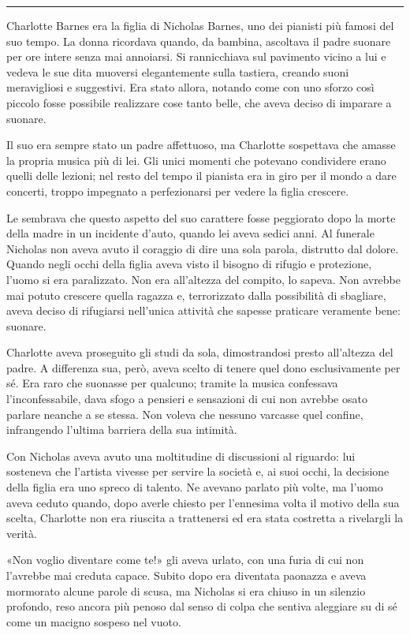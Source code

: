 \documentclass[a4paper,oneside,9pt]{memoir}
\begin{document}
\plainbreak{1}

Charlotte Barnes era la figlia di Nicholas Barnes, uno dei pianisti più famosi del suo tempo. La donna ricordava
quando, da bambina, ascoltava il padre suonare per ore intere senza mai annoiarsi. Si rannicchiava sul pavimento vicino
a lui e vedeva le sue dita muoversi elegantemente sulla tastiera, creando suoni meravigliosi e suggestivi. Era stato
allora, notando come con uno sforzo così piccolo fosse possibile realizzare cose tanto belle, che aveva deciso di
imparare a suonare.

Il suo era sempre stato un padre affettuoso, ma Charlotte sospettava che amasse la propria musica più di lei. Gli unici
momenti che potevano condividere erano quelli delle lezioni; nel resto del tempo il pianista era in giro per il mondo a
dare concerti, troppo impegnato a perfezionarsi per vedere la figlia crescere.

Le sembrava che questo aspetto del suo carattere fosse peggiorato dopo la morte della madre in un incidente d'auto,
quando lei aveva sedici anni. Al funerale Nicholas non aveva avuto il coraggio di dire una sola parola, distrutto dal
dolore. Quando negli occhi della figlia aveva visto il bisogno di rifugio e protezione, l'uomo si era paralizzato. Non
era all'altezza del compito, lo sapeva. Non avrebbe mai potuto crescere quella ragazza e, terrorizzato dalla
possibilità di sbagliare, aveva deciso di rifugiarsi nell'unica attività che sapesse praticare veramente bene:
suonare.

Charlotte aveva proseguito gli studi da sola, dimostrandosi presto all'altezza del padre. A differenza sua, però, aveva
scelto di tenere quel dono esclusivamente per sé. Era raro che suonasse per qualcuno; tramite la musica confessava
l'inconfessabile, dava sfogo a pensieri e sensazioni di cui non avrebbe osato parlare neanche a se stessa. Non voleva
che nessuno varcasse quel confine, infrangendo l'ultima barriera della sua intimità.

Con Nicholas aveva avuto una moltitudine di discussioni al riguardo: lui sosteneva che l'artista vivesse per servire la
società e, ai suoi occhi, la decisione della figlia era uno spreco di talento. Ne avevano parlato più volte, ma l'uomo
aveva ceduto quando, dopo averle chiesto per l'ennesima volta il motivo della sua scelta, Charlotte non era riuscita a
trattenersi ed era stata costretta a rivelargli la verità.

«Non voglio diventare come te!» gli aveva urlato, con una furia di cui non l'avrebbe mai creduta capace. Subito dopo
era diventata paonazza e aveva mormorato alcune parole di scusa, ma Nicholas si era chiuso in un silenzio profondo, reso
ancora più penoso dal senso di colpa che sentiva aleggiare su di sé come un macigno sospeso nel vuoto.
\end{document}
